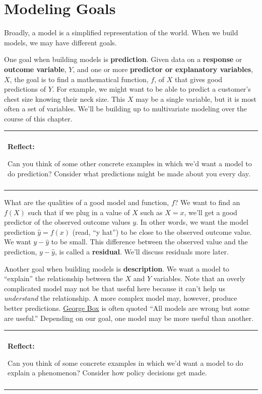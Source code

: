 \documentclass[
]{book}
\newenvironment{reflect}
{
    \begin{center}
    
    \begin{tabular}{|p{0.8\textwidth}|}
    \rowcolor{LightBlue}
    \hline\\
    \rowcolor{LightBlue}
    \textbf{Reflect:}
}
{
    \\\rowcolor{LightBlue}
    \\\hline
    \end{tabular} 
    \end{center}
}
\begin{document}
\hypertarget{modeling-goals}{%
\section{Modeling Goals}\label{modeling-goals}}

Broadly, a model is a simplified representation of the world. When we build models, we may have different goals.

One goal when building models is \textbf{prediction}. Given data on a \textbf{response} or \textbf{outcome variable}, \(Y\), and one or more \textbf{predictor or explanatory variables}, \(X\), the goal is to find a mathematical function, \(f\), of \(X\) that gives good predictions of \(Y\). For example, we might want to be able to predict a customer's chest size knowing their neck size. This \(X\) may be a single variable, but it is most often a set of variables. We'll be building up to multivariate modeling over the course of this chapter.

\begin{reflect}
Can you think of some other concrete examples in which we'd want a model
to do prediction? Consider what predictions might be made about you
every day.
\end{reflect}

What are the qualities of a good model and function, \(f\)? We want to find an \(f(X)\) such that if we plug in a value of \(X\) such as \(X=x\), we'll get a good predictor of the observed outcome values \(y\). In other words, we want the model prediction \(\hat{y}=f(x)\) (read, ``y hat'') to be close to the observed outcome value. We want \(y-\hat{y}\) to be small. This difference between the observed value and the prediction, \(y-\hat{y}\), is called a \textbf{residual}. We'll discuss residuals more later.

Another goal when building models is \textbf{description}. We want a model to ``explain'' the relationship between the \(X\) and \(Y\) variables. Note that an overly complicated model may not be that useful here because it can't help us \emph{understand} the relationship. A more complex model may, however, produce better predictions. \href{https://en.wikipedia.org/wiki/George_E._P._Box}{George Box} is often quoted ``All models are wrong but some are useful.'' Depending on our goal, one model may be more useful than another.

\begin{reflect}
Can you think of some concrete examples in which we'd want a model to do
explain a phenomenon? Consider how policy decisions get made.
\end{reflect}
\end{document}
